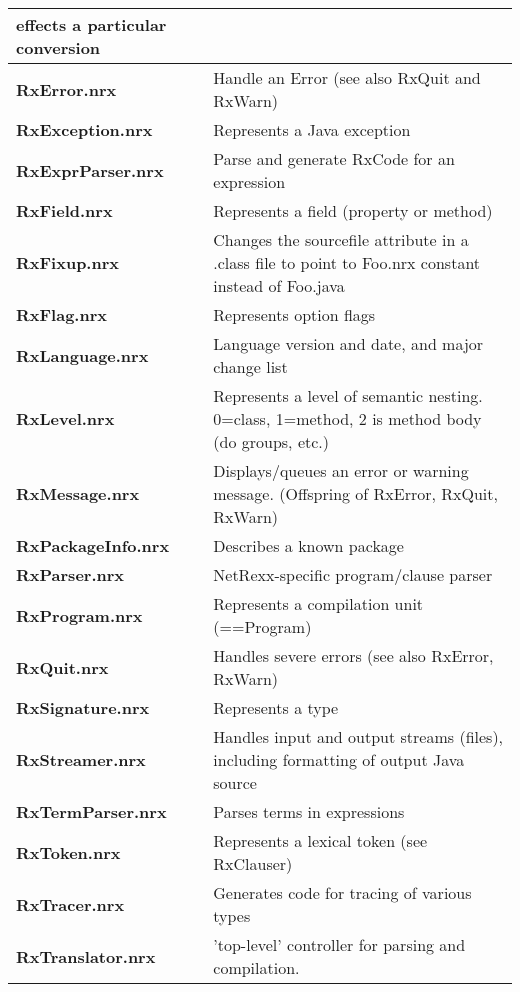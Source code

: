 {\begin{table}
\begin{tabularx}{\textwidth}{>{\bfseries}lX}
                         effects a particular conversion
\\\midrule
  RxError.nrx         & Handle an Error (see also RxQuit and RxWarn)
\\\midrule
  RxException.nrx     & Represents a Java exception
\\\midrule
  RxExprParser.nrx    & Parse and generate RxCode for an expression
\\\midrule
  RxField.nrx         & Represents a field (property or method)
\\\midrule
  RxFixup.nrx         & Changes the sourcefile attribute in a .class
                         file to point to Foo.nrx constant instead of
                         Foo.java
\\\midrule
  RxFlag.nrx          & Represents option flags
\\\midrule
  RxLanguage.nrx      & Language version and date, and major change
                         list
\\\midrule
  RxLevel.nrx         & Represents a level of semantic nesting.
                         0=class, 1=method, 2  is method body (do
                         groups, etc.)
\\\midrule
  RxMessage.nrx       & Displays/queues an error or warning message.
                         (Offspring of RxError, RxQuit, RxWarn)
\\\midrule
  RxPackageInfo.nrx   & Describes a known package
\\\midrule
  RxParser.nrx        & NetRexx-specific program/clause parser
\\\midrule
  RxProgram.nrx       & Represents a compilation unit (==Program)
\\\midrule
  RxQuit.nrx          & Handles severe errors (see also RxError,
  RxWarn)
\\\midrule
  RxSignature.nrx     & Represents a type
\\\midrule
  RxStreamer.nrx      & Handles input and output streams (files),
                         including formatting of output Java source
\\\midrule
  RxTermParser.nrx    & Parses terms in expressions
\\\midrule
  RxToken.nrx         & Represents a lexical token (see RxClauser)
\\\midrule
  RxTracer.nrx        & Generates code for tracing of various types
\\\midrule
  RxTranslator.nrx    & 'top-level' controller for parsing and
                         compilation.

\end{tabularx}
\end{table}}
